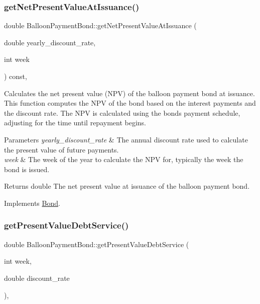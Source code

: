 \subsubsection{\texorpdfstring{get\+Net\+Present\+Value\+At\+Issuance()}{getNetPresentValueAtIssuance()}}
{\footnotesize\ttfamily double Balloon\+Payment\+Bond\+::get\+Net\+Present\+Value\+At\+Issuance (\begin{DoxyParamCaption}\item[{double}]{yearly\+\_\+discount\+\_\+rate,  }\item[{int}]{week }\end{DoxyParamCaption}) const\hspace{0.3cm}{\ttfamily [override]}, {\ttfamily [virtual]}}



Calculates the net present value (N\+PV) of the balloon payment bond at issuance. This function computes the N\+PV of the bond based on the interest payments and the discount rate. The N\+PV is calculated using the bond\textquotesingle{}s payment schedule, adjusting for the time until repayment begins. 


\begin{DoxyParams}{Parameters}
{\em yearly\+\_\+discount\+\_\+rate} & The annual discount rate used to calculate the present value of future payments. \\
\hline
{\em week} & The week of the year to calculate the N\+PV for, typically the week the bond is issued.\\
\hline
\end{DoxyParams}
\begin{DoxyReturn}{Returns}
double The net present value at issuance of the balloon payment bond. 
\end{DoxyReturn}


Implements \mbox{\hyperlink{classBond_a5997278813deb16aa5d01bbca8ecc7b2}{Bond}}.

\mbox{\label{classBalloonPaymentBond_ae038863f7a3408c2c8cd503d8e789f2d}} 
\subsubsection{\texorpdfstring{get\+Present\+Value\+Debt\+Service()}{getPresentValueDebtService()}}
{\footnotesize\ttfamily double Balloon\+Payment\+Bond\+::get\+Present\+Value\+Debt\+Service (\begin{DoxyParamCaption}\item[{int}]{week,  }\item[{double}]{discount\+\_\+rate }\end{DoxyParamCaption})\hspace{0.3cm}{\ttfamily [override]}, {\ttfamily [virtual]}}



